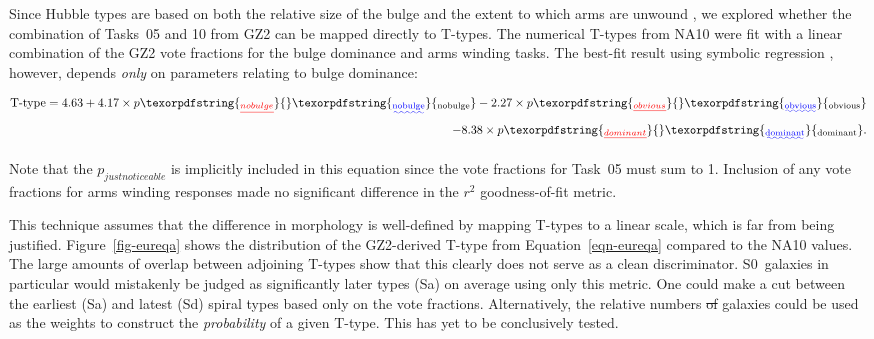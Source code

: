 \documentclass[useAMS,usenatbib]{mn2e}
\providecommand{\DIFaddtex}[1]{{\protect\color{blue}\uwave{#1}}} %
\providecommand{\DIFdeltex}[1]{{\protect\color{red}\sout{#1}}}                      %
\providecommand{\DIFaddbegin}{} %
\providecommand{\DIFaddend}{} %
\providecommand{\DIFdelbegin}{} %
\providecommand{\DIFdelend}{} %
\providecommand{\DIFadd}[1]{\texorpdfstring{\DIFaddtex{#1}}{#1}} %
\providecommand{\DIFdel}[1]{\texorpdfstring{\DIFdeltex{#1}}{}} %
\begin{document}

Since Hubble types are based on both the relative size of the bulge and the extent to which arms are unwound \citep{hub26}, we explored whether the combination of Tasks~05 and 10 from GZ2 can be mapped directly to T-types. The numerical T-types from NA10 were fit with a linear combination of the GZ2 vote fractions for the bulge dominance and arms winding tasks. The best-fit result using symbolic regression \citep{sch09c}, however, depends {\em only} on parameters relating to bulge dominance:
\DIFdelbegin %

\DIFdelend \begin{eqnarray}
\label{eqn-eureqa}
\text{T-type} = 4.63 + 4.17\times p\DIFdelbegin \DIFdel{_{no bulge} }\DIFdelend \DIFaddbegin \DIFadd{_\mathrm{no bulge} }\DIFaddend - 2.27\times p\DIFdelbegin \DIFdel{_{obvious} }\DIFdelend \DIFaddbegin \DIFadd{_\mathrm{obvious} }\DIFaddend \\ \nonumber
- 8.38\times p\DIFdelbegin \DIFdel{_{dominant}}\DIFdelend \DIFaddbegin \DIFadd{_\mathrm{dominant}}\DIFaddend .
\end{eqnarray}
\DIFdelbegin %

\DIFdelend Note that the \DIFdelbegin \DIFdel{$p_{just noticeable}$ }\DIFdelend \DIFaddbegin \DIFadd{$p_\mathrm{just noticeable}$ }\DIFaddend is implicitly included in this equation since the vote fractions for Task~05 must sum to 1. Inclusion of any vote fractions for arms winding responses made no significant difference in the $r^2$ goodness-of-fit metric.

This technique assumes that the difference in morphology is well-defined by mapping T-types to a linear scale, which is far from being justified. Figure~\ref{fig-eureqa} shows the distribution of the GZ2-derived T-type from Equation~\ref{eqn-eureqa} compared to the NA10 values. The large amounts of overlap between adjoining T-types show that this clearly does not serve as a clean discriminator. S0~galaxies in particular would mistakenly be judged as significantly later types (Sa) on average using only this metric. One could make a cut between the earliest (Sa) and latest (Sd) spiral types based only on the vote fractions. Alternatively, the relative numbers \DIFdelbegin \DIFdel{of }\DIFdelend galaxies could be used as the weights to construct the {\em probability} of a given T-type. This has yet to be conclusively tested. 
\end{document}
